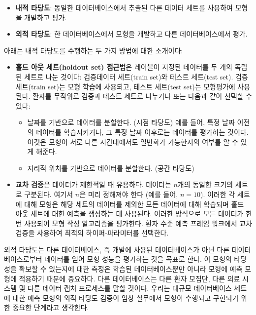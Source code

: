\documentclass[11pt]{book}
\providecommand{\tightlist}{%
  \setlength{\itemsep}{0pt}\setlength{\parskip}{0pt}}
\theoremstyle{definition}
\theoremstyle{definition}
\theoremstyle{definition}
\theoremstyle{remark}
\begin{document}
\begin{itemize}
\tightlist
\item
  \textbf{내적 타당도}: 동일한 데이터베이스에서 추출된 다른 데이터
  세트를 사용하여 모형을 개발하고 평가.
\item
  \textbf{외적 타당도}: 한 데이터베이스에서 모형을 개발하고 다른
  데이터베이스에서 평가. 
\end{itemize}

아래는 내적 타당도를 수행하는 두 가지 방법에 대한 소개이다:

\begin{itemize}
\tightlist
\item
  \textbf{홀드 아웃 세트(holdout set) 접근법}은 레이블이 지정된 데이터를
  두 개의 독립된 세트로 나눈 것이다: 검증데이터 세트(train set)와 테스트
  세트(test set). 검증 세트(train set)는 모형 학습에 사용되고, 테스트
  세트(test set)는 모형평가에 사용된다. 환자를 무작위로 검증과 테스트
  세트로 나누거나 또는 다음과 같이 선택할 수 있다:

  \begin{itemize}
  \tightlist
  \item
    날짜를 기반으로 데이터를 분할한다. (시점 타당도) 예를 들어, 특정
    날짜 이전의 데이터를 학습시키거나, 그 특정 날짜 이후로는 데이터를
    평가하는 것이다. 이것은 모형이 서로 다른 시간대에서도 일반화가
    가능한지의 여부를 알 수 있게 해준다.
  \item
    지리적 위치를 기반으로 데이터를 분할한다. (공간 타당도)
  \end{itemize}
\item
  \textbf{교차 검증}은 데이터가 제한적일 때 유용하다. 데이터는 \(n\)개의
  동일한 크기의 세트로 구분된다. 여기서 \(n\)은 미리 정해져야 한다 (예를
  들어, \(n=10\)). 이러한 각 세트에 대해 모형은 해당 세트의 데이터를
  제외한 모든 데이터에 대해 학습되며 홀드 아웃 세트에 대한 예측을
  생성하는 데 사용된다. 이러한 방식으로 모든 데이터가 한 번 사용되어
  모형 작성 알고리즘을 평가한다. 환자 수준 예측 프레임 워크에서 교차
  검증을 사용하여 최적의 하이퍼-파라미터를 선택한다.
\end{itemize}

외적 타당도는 다른 데이터베이스, 즉 개발에 사용된 데이터베이스가 아닌
다른 데이터베이스로부터 데이터를 얻어 모형 성능을 평가하는 것을 목표로
한다. 이 모형의 타당성을 확보할 수 있는지에 대한 측정은 학습된
데이터베이스뿐만 아니라 모형에 예측 모형에 적용하기 때문에 중요하다.
다른 데이터베이스는 다른 환자 모집단, 다른 의료 시스템 및 다른 데이터
캡처 프로세스를 말할 것이다. 우리는 대규모 데이터베이스 세트에 대한 예측
모형의 외적 타당도 검증이 임상 실무에서 모형이 수행되고 구현되기 위한
중요한 단계라고 생각한다.
\end{document}
